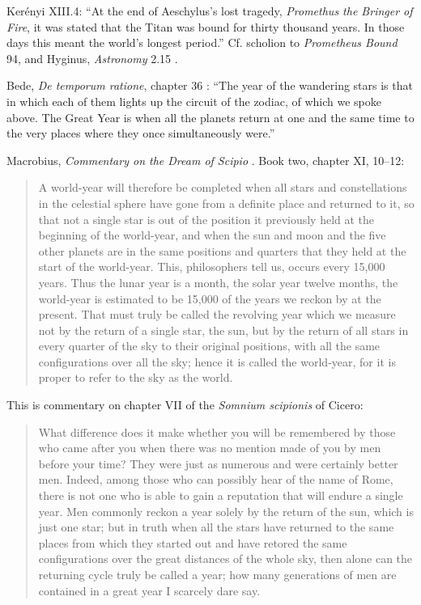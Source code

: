 \documentclass{article}
\begin{document}
Ker\'enyi \cite{kerenyi} XIII.4: ``At the end of Aeschylus's lost tragedy, {\em Promethus the Bringer of Fire}, it was stated that the Titan was bound for thirty thousand years. In those days this meant the world's longest period.'' Cf. scholion to {\em Prometheus Bound} 94, and 
Hyginus, {\em Astronomy} 2.15 \cite[pp.~54--55]{constellations}.

Bede, {\em De temporum ratione}, chapter 36 \cite[p.~104]{bede}: ``The year of the wandering stars is that in which each of them lights up the circuit of the zodiac, of which we spoke above. The Great Year is when all the planets return at one and the same time to the very places where they once simultaneously were.''

Macrobius, {\em Commentary on the Dream of Scipio} \cite[pp.~219--222]{macrobius}. Book two, chapter XI, 10--12:

\begin{quote}
A world-year will therefore be completed when all stars and constellations in the celestial sphere have gone from a definite place and returned to it, so that
not a single star is out of the position it previously held at the beginning of the world-year, and when the sun and moon and the five other planets are in the same positions
and quarters that they held at the start of the world-year. This, philosophers tell us, occurs every 15,000 years. Thus the lunar year is a month, the solar year twelve
months, the world-year is estimated to be 15,000 of the years we reckon by at the present. That must truly be called the revolving year which we measure
not by the return of a single star, the sun, but by the return of all stars in every quarter of the sky to their original positions, with all
the same configurations over all the sky; hence it is called the world-year, for it is proper to refer to the sky as the world.
\end{quote}

This is commentary on chapter VII of the {\em Somnium scipionis} of Cicero:

\begin{quote}
What difference does it make whether you will be remembered by those who came after you when there was no mention made of you by men
before your time? They were just as numerous and were certainly better men. Indeed, among those who can possibly hear of the name of Rome,
there is not one who is able to gain a reputation that will endure a single year. Men commonly reckon a year solely by the return of the sun, which is just one star;
but in truth when all the stars have returned to the same places from which they started out and have retored the same configurations over the great distances
of the whole sky, then alone can the returning cycle truly be called a year; how many generations of men are contained in a great year I scarcely dare say.
\end{quote}
\end{document}
